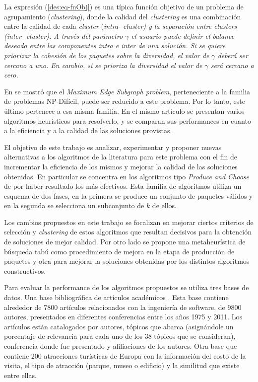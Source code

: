 La expresión (\ref{des:eq-fnObj}) es una típica función objetivo de un problema de agrupamiento ({\em clustering}), donde la calidad del {\em clustering} es una combinación entre la calidad de cada {\em cluster} (\em{intra}- cluster) y la separación entre {\em clusters} (\em{inter}- cluster). A través del parámetro $\gamma$ el usuario puede definir el balance deseado entre las componentes intra e inter de una solución. Si se quiere priorizar la cohesión de los paquetes sobre la diversidad, el  valor de $\gamma$ deberá ser cercano a uno. En cambio, si se prioriza la diversidad el valor de $\gamma$ será cercano a cero.

En \cite{compositeRetrival} se mostró que el {\em Maximum Edge Subgraph problem}, perteneciente a la familia de problemas NP-Difícil, puede ser reducido a este problema. Por lo tanto, este último pertenece a esa misma familia. En el mismo artículo se presentan varios algoritmos heurísticos para resolverlo, y se comparan sus performances en cuanto a la eficiencia y a la calidad de las soluciones provistas.   

El objetivo de este trabajo es analizar, experimentar y proponer nuevas alternativas a los algoritmos de la literatura para este problema con el fin de incrementar la eficiencia de los mismos y mejorar la calidad de las soluciones obtenidas. En particular se concentra en los algoritmos tipo {\em Produce and Choose} de \cite{compositeRetrival} por haber resultado los más efectivos. Esta familia de algoritmos utiliza un esquema de dos fases, en la primera se produce un conjunto de paquetes válidos y en la segunda se selecciona un subconjunto de $k$ de ellos.

Los cambios propuestos en este trabajo se focalizan en mejorar ciertos criterios de selección y {\em clustering} de estos algoritmos que resultan decisivos para la obtención de soluciones de mejor calidad. Por otro lado se propone una metaheurística de búsqueda tabú como procedimiento de mejora en la etapa de producción de paquetes y otra para mejorar la soluciones obtenidas por los distintos algoritmos constructivos.
 
Para evaluar la performance de los algoritmos propuestos se utiliza tres bases de datos. Una base bibliográfica de artículos académicos \cite{dataDrive}. Esta base contiene alrededor de 7800 artículos relacionados con la ingeniería de software, de 9800 autores, presentados en diferentes conferencias entre los años 1975 y 2011. Los artículos están catalogados por autores, tópicos que abarca (asignándole un porcentaje de relevancia para cada uno de los 38 tópicos que se consideran), conferencia donde fue presentado y afiliaciones de los autores. Otra base que contiene 200 atracciones turísticas de Europa con la información del costo de la visita, el tipo de atracción (parque, museo o edificio) y la similitud que existe entre ellas.

